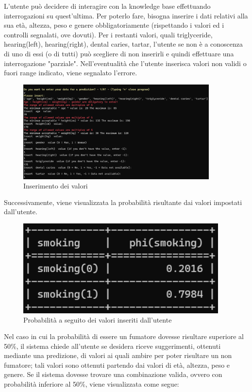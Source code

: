 \documentclass{article}
\begin{document}
L'utente può decidere di interagire con la knowledge base effettuando interrogazioni su quest’ultima. Per poterlo fare, bisogna inserire i dati relativi alla sua età, altezza, peso e genere obbligatoriamente (rispettando i valori ed i controlli segnalati, ove dovuti). Per i restanti valori, quali triglyceride, hearing(left), hearing(right), dental caries, tartar, l'utente se non è a conoscenza di uno di essi (o di tutti) può scegliere di non inserirli e quindi effettuare una interrogazione "parziale". Nell'eventualità che l'utente inserisca valori non validi o fuori range indicato, viene segnalato l'errore.

\begin{figure}[H]
        \includegraphics[width=0.9\textwidth]{interazione1}
        \centering
        \caption{Inserimento dei valori}
        \centering
\end{figure}
%

\noindent
Successivamente, viene visualizzata la probabilità risultante dai valori impostati dall'utente.

\begin{figure}[H]
        \includegraphics[width=10.6cm]{probility}
        \centering
        \caption{Probabilità a seguito dei valori inseriti dall'utente}
        \centering
\end{figure}
%

\noindent
Nel caso in cui la probabilità di essere un fumatore dovesse risultare superiore al 50\%, il sistema chiede all'utente se desidera riceve suggerimenti, ottenuti mediante una predizione, di valori ai quali ambire per poter risultare un non fumatore; tali valori sono ottenuti partendo dai valori di età, altezza, peso e genere.
Se il sistema dovesse trovare una combinazione valida, ovvero con probabilità inferiore al 50\%, viene visualizzata come segue:
\end{document}
